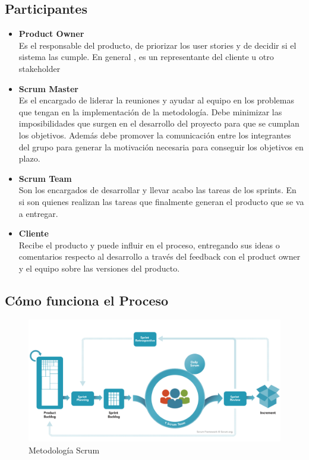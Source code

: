 \subsection{Participantes}
\begin{itemize}
\item \textbf{Product Owner}\\
Es el responsable del producto, de priorizar los user stories y de decidir si el sistema las cumple. En general , es un representante del cliente u otro stakeholder


\item \textbf{Scrum Master}\\
Es el encargado de liderar la reuniones y ayudar al equipo en los problemas que tengan  en la implementación de la metodología. Debe minimizar las imposibilidades que surgen en el desarrollo del proyecto para que se cumplan los objetivos. Además debe promover la comunicación entre los integrantes del grupo para generar la motivación necesaria para conseguir los objetivos en plazo.




\item  \textbf{Scrum Team}\\
Son los encargados de desarrollar y llevar acabo las tareas de los sprints. En si son quienes realizan las tareas que finalmente generan el producto que se va a entregar.


\item  \textbf{Cliente}\\
Recibe el producto y puede influir en el proceso, entregando sus ideas o comentarios respecto al desarrollo a través del feedback con el product owner y el equipo sobre las versiones del producto. 
\end{itemize}

\subsection{Cómo funciona el Proceso}



\begin{figure}
		\centering
		\includegraphics[width=\textwidth] {scrum.jpg}
		\caption{Metodología Scrum }
		\label{fig:scrum}
	\end{figure} 


